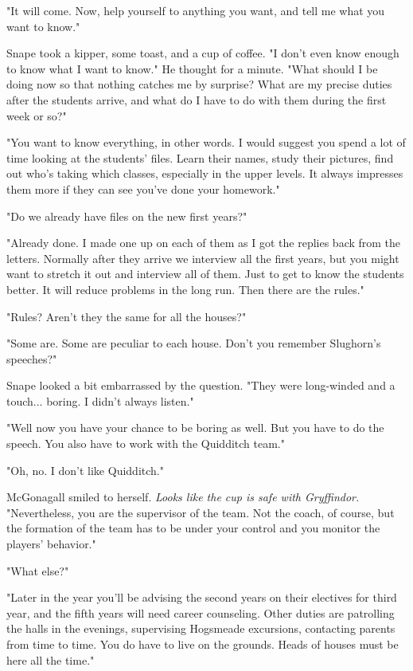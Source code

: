 "It will come. Now, help yourself to anything you want, and tell me what you want to know."

Snape took a kipper, some toast, and a cup of coffee. "I don't even know enough to know what I want to know." He thought for a minute. "What should I be doing now so that nothing catches me by surprise? What are my precise duties after the students arrive, and what do I have to do with them during the first week or so?"

"You want to know everything, in other words. I would suggest you spend a lot of time looking at the students' files. Learn their names, study their pictures, find out who's taking which classes, especially in the upper levels. It always impresses them more if they can see you've done your homework."

"Do we already have files on the new first years?"

"Already done. I made one up on each of them as I got the replies back from the letters. Normally after they arrive we interview all the first years, but you might want to stretch it out and interview all of them. Just to get to know the students better. It will reduce problems in the long run. Then there are the rules."

"Rules? Aren't they the same for all the houses?"

"Some are. Some are peculiar to each house. Don't you remember Slughorn's speeches?"

Snape looked a bit embarrassed by the question. "They were long-winded and a touch... boring. I didn't always listen."

"Well now you have your chance to be boring as well. But you have to do the speech. You also have to work with the Quidditch team."

"Oh, no. I don't like Quidditch."

McGonagall smiled to herself. \emph{Looks like the cup is safe with Gryffindor.} "Nevertheless, you are the supervisor of the team. Not the coach, of course, but the formation of the team has to be under your control and you monitor the players' behavior."

"What else?"

"Later in the year you'll be advising the second years on their electives for third year, and the fifth years will need career counseling. Other duties are patrolling the halls in the evenings, supervising Hogsmeade excursions, contacting parents from time to time. You do have to live on the grounds. Heads of houses must be here all the time."


